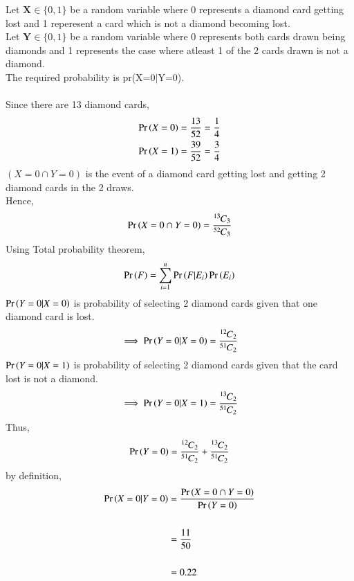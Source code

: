 Let $\textbf{X} \in \{0,1\}$ be a random variable where 0 represents a diamond card getting lost and 1 reperesent  a card which is not a diamond becoming lost. \\
Let $\textbf{Y} \in \{0,1\} $ be a random variable where 0 represents both cards drawn being diamonds and 1 represents the case where atleast 1 of the 2 cards drawn is not a diamond.\\
The required probability is pr(X=0$|$Y=0).\\
\\Since there are 13 diamond cards,
\begin{align}
    \Pr\left(X=0\right)=\frac{13}{52}=\frac{1}{4}\\
    \Pr\left(X=1\right)=\frac{39}{52}=\frac{3}{4}
\end{align}
$(X=0 \cap Y=0)$ is the event of a diamond card getting lost and getting 2 diamond cards in the 2 draws.\\
Hence,
\begin{align}
    \Pr\left(X=0 \cap Y=0\right)=\frac{{{}^{13}\mkern-1muC_{3}}}{{{}^{52}\mkern-1muC_{3}}}
\end{align}
Using Total probability theorem,
\begin{align}
    \Pr\left(F\right)=\sum_{i=1}^{n}\Pr\left(F \vert E_{i}\right)\Pr\left(E_{i}\right) \label{5.16:eq1}
\end{align}
$\Pr\left(Y=0|X=0\right)$ is probability of selecting 2 diamond cards given that one diamond card is lost.
\begin{align}
   \implies \Pr\left(Y=0 \vert X=0\right)=\frac{{{}^{12}\mkern-1muC_{2}}}{{{}^{51}\mkern-1muC_{2}}}
\end{align}
$\Pr\left(Y=0|X=1\right)$ is probability of selecting 2 diamond cards given that the card lost is not a diamond.
\begin{align}
    \implies \Pr\left(Y=0 \vert X=1\right)=\frac{{{}^{13}\mkern-1muC_{2}}}{{{}^{51}\mkern-1muC_{2}}}
\end{align}
Thus,
\begin{align}
\begin{split}
    \Pr\left(Y=0\right)=\frac{{{}^{12}\mkern-1muC_{2}}}{{{}^{51}\mkern-1muC_{2}}}+\frac{{{}^{13}\mkern-1muC_{2}}}{{{}^{51}\mkern-1muC_{2}}}
\end{split}
\end{align}
by definition,
\begin{align}
\begin{split}
    \Pr\left(X=0 \vert Y=0\right)&=\frac{\Pr\left(X=0 \cap Y=0\right)}{\Pr\left(Y=0\right)}\\\\
                     &=\frac{11}{50}\\\\
                     &=0.22
\end{split}
\end{align}